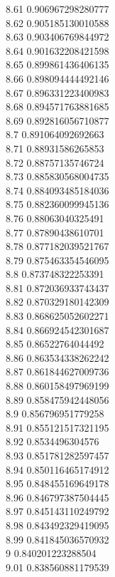 {8.61	0.906967298280777\\
8.62	0.905185130010588\\
8.63	0.903406769844972\\
8.64	0.901632208421598\\
8.65	0.899861436406135\\
8.66	0.898094444492146\\
8.67	0.896331223400983\\
8.68	0.894571763881685\\
8.69	0.892816056710877\\
8.7	0.891064092692663\\
8.71	0.88931586265853\\
8.72	0.88757135746724\\
8.73	0.885830568004735\\
8.74	0.884093485184036\\
8.75	0.882360099945136\\
8.76	0.88063040325491\\
8.77	0.87890438610701\\
8.78	0.877182039521767\\
8.79	0.875463354546095\\
8.8	0.873748322253391\\
8.81	0.872036933743437\\
8.82	0.870329180142309\\
8.83	0.868625052602271\\
8.84	0.866924542301687\\
8.85	0.86522764044492\\
8.86	0.863534338262242\\
8.87	0.861844627009736\\
8.88	0.860158497969199\\
8.89	0.858475942448056\\
8.9	0.856796951779258\\
8.91	0.855121517321195\\
8.92	0.8534496304576\\
8.93	0.851781282597457\\
8.94	0.850116465174912\\
8.95	0.848455169649178\\
8.96	0.846797387504445\\
8.97	0.845143110249792\\
8.98	0.843492329419095\\
8.99	0.841845036570932\\
9	0.840201223288504\\
9.01	0.838560881179539\\
}
